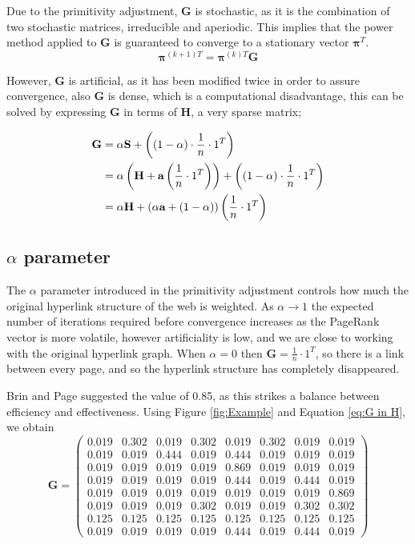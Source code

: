 \documentclass[11pt]{report}
\begin{document}
Due to the primitivity adjustment, \textbf{G} is stochastic, as it is the combination of two stochastic matrices, irreducible and aperiodic. This implies that the power method applied to \textbf{G} is guaranteed to converge to a stationary vector $\boldsymbol{\pi}^T$.
\begin{equation}\label{eq:power to G}
\boldsymbol{\pi}^{(k+1)T} = \boldsymbol{\pi}^{(k)T}\textbf{G}
\end{equation} 

However, \textbf{G} is artificial, as it has been modified twice in order to assure convergence, also \textbf{G} is dense, which is a computational disadvantage, this can be solved by expressing \textbf{G} in terms of \textbf{H}, a very sparse matrix; 
 
\begin{align}
\textbf{G} & = \alpha\textbf{S}+\left((1-\alpha)\cdot\frac{1}{n}\cdot1^T\right)\notag\\
& = \alpha \left(\textbf{H} + \textbf{a}\left(\frac{1}{n}\cdot 1^{T}\right)\right) + \left((1-\alpha)\cdot\frac{1}{n}\cdot1^T\right)\notag\\
& = \alpha\textbf{H} + (\alpha\textbf{a} +(1-\alpha))\left(\frac{1}{n}\cdot 1^T\right)\label{eq:G in H}
\end{align} 

\subsection{$\alpha$ parameter} \label{sec:alpha}
The $\alpha$ parameter introduced in the primitivity adjustment controls how much the original hyperlink structure of the web is weighted. As $\alpha \rightarrow 1$ the expected number of iterations required before convergence increases as the PageRank vector is more volatile, however artificiality is low, and we are close to working with the original hyperlink graph. When $\alpha =0$ then $\textbf{G}=\frac{1}{n}\cdot 1^T$, so there is a link between every page, and so the hyperlink structure has completely disappeared. 

Brin and Page suggested the value of 0.85, as this strikes a balance between efficiency and effectiveness. Using Figure \ref{fig:Example} and Equation \eqref{eq:G in H}, we obtain
\begin{equation}
\textbf{G} = \left(
\begin{array}{cccccccc}
0.019 & 0.302 & 0.019 & 0.302 & 0.019 & 0.302 & 0.019 & 0.019  \\
0.019 & 0.019 & 0.444 & 0.019 & 0.444 & 0.019 & 0.019 & 0.019  \\
0.019 & 0.019 & 0.019 & 0.019 & 0.869 & 0.019 & 0.019 & 0.019  \\
0.019 & 0.019 & 0.019 & 0.019 & 0.444 & 0.019 & 0.444 & 0.019  \\
0.019 & 0.019 & 0.019 & 0.019 & 0.019 & 0.019 & 0.019 & 0.869  \\
0.019 & 0.019 & 0.019 & 0.302 & 0.019 & 0.019 & 0.302 & 0.302  \\
0.125 & 0.125 & 0.125 & 0.125 & 0.125 & 0.125 & 0.125 & 0.125  \\
0.019 & 0.019 & 0.019 & 0.019 & 0.444 & 0.019 & 0.444 & 0.019 
\end{array}
\right)
\end{equation}
\end{document}
